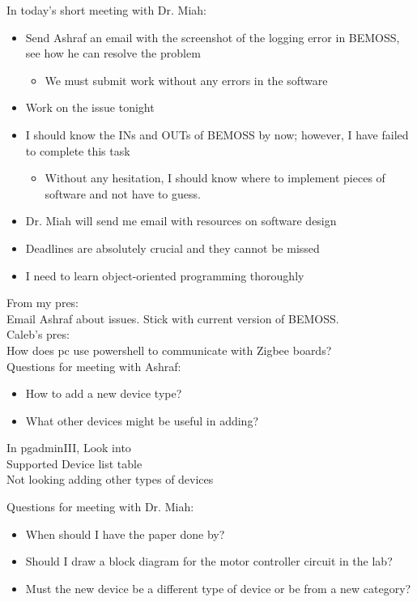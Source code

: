 \documentclass[fontsize=11pt, %
                             paper=letter, %
                             twoside, %
                             captions=tableheading,
                             index=totoc,
                             hyperref]{labbook}
\begin{document}
\begin{addmargin}[0cm]{0cm}
In today's short meeting with Dr. Miah:
\begin{itemize}
\item Send Ashraf an email with the screenshot of the logging error in BEMOSS, see how he can resolve the problem
\begin{itemize}
\item We must submit work without any errors in the software
\end{itemize}
\item Work on the issue tonight
\item I should know the INs and OUTs of BEMOSS by now; however, I have failed to complete this task
\begin{itemize}
\item Without any hesitation, I should know where to implement pieces of software and not have to guess.
\end{itemize}
\item Dr. Miah will send me email with resources on software design
\item Deadlines are absolutely crucial and they cannot be missed
\item I need to learn object-oriented programming thoroughly
\end{itemize}

From my pres:\\
Email Ashraf about issues. Stick with current version of BEMOSS.\\
Caleb's pres:\\
How does pc use powershell to communicate with Zigbee boards?\\

Questions for meeting with Ashraf:
\begin{itemize}
\item How to add a new device type?
\item What other devices might be useful in adding?
\end{itemize}
In pgadminIII,
Look into\\
Supported Device list table\\
Not looking adding other types of devices

Questions for meeting with Dr. Miah:
\begin{itemize}
\item When should I have the paper done by?
\item Should I draw a block diagram for the motor controller circuit in the lab?
\item Must the new device be a different type of device or be from a new category?
\end{itemize}
\end{addmargin}
\end{document}

